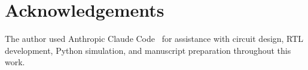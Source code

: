 \documentclass[journal,10pt,twoside]{IEEEtran}
\begin{document}
\section*{Acknowledgements}

The author used Anthropic Claude Code~\cite{anthropic2025claudecode} for
assistance with circuit design, RTL development, Python simulation, and
manuscript preparation throughout this work.



\end{document}
